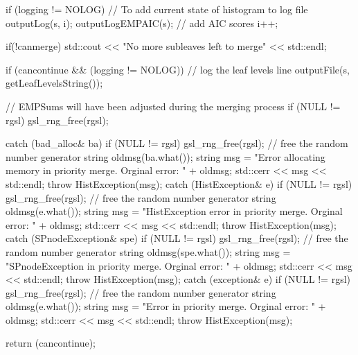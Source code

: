 \begin{DoxyCode}
{{{            if (logging != NOLOG) {
                // To add current state of histogram to log file
                outputLog(s, i);
                outputLogEMPAIC(s); // add AIC scores
                i++;
            }
        }

        if(!canmerge) {
            std::cout << "No more subleaves left to merge" << std::endl;
        }

        if (cancontinue && (logging != NOLOG)) {
            // log the leaf levels line
            outputFile(s, getLeafLevelsString());
        }

        // EMPSums will have been adjusted during the merging process
        if (NULL != rgsl) gsl_rng_free(rgsl);
    }
    catch (bad_alloc& ba) {
        if (NULL != rgsl) gsl_rng_free(rgsl); // free the random number
       generator
        string oldmsg(ba.what());
        string msg = "Error allocating memory in priority merge.  Orginal
       error: "
                                     + oldmsg;
        std::cerr << msg << std::endl;
        throw HistException(msg);
    }
    catch (HistException& e) {
        if (NULL != rgsl) gsl_rng_free(rgsl); // free the random number
       generator
        string oldmsg(e.what());
        string msg = "HistException error  in priority merge.  Orginal error: "
                                    + oldmsg;
        std::cerr << msg << std::endl;
        throw HistException(msg);
    }
    catch (SPnodeException& spe) {
        if (NULL != rgsl) gsl_rng_free(rgsl); // free the random number
       generator
        string oldmsg(spe.what());
        string msg = "SPnodeException  in priority merge.  Orginal error: "
                                    + oldmsg;
        std::cerr << msg << std::endl;
        throw HistException(msg);
    }
    catch (exception& e) {
        if (NULL != rgsl) gsl_rng_free(rgsl); // free the random number
       generator
        string oldmsg(e.what());
        string msg = "Error  in priority merge.  Orginal error: " + oldmsg;
        std::cerr << msg << std::endl;
        throw HistException(msg);
    }


    return (cancontinue);
}
\end{DoxyCode}
